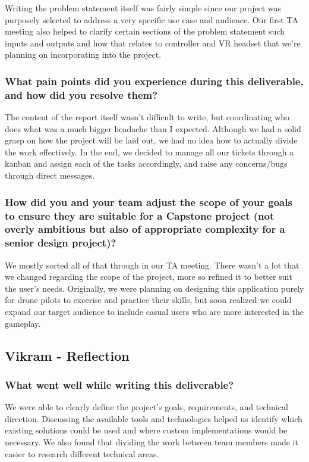 \documentclass{article}
\begin{document}
Writing the problem statement itself was fairly simple since our
project was purposely selected to address a very specific use case
and audience. Our first TA meeting also helped to clarify certain sections of
the problem statement such inputs and outputs and how that relates to controller
and VR headset that we're planning on incorporating into the project.

\subsubsection*{What pain points did you experience during this deliverable, and how did you resolve them?}

The content of the report itself wasn't difficult to write, but coordinating who does what was a
much bigger headache than I expected. Although we had a solid grasp on how the project
will be laid out, we had no idea how to actually divide the work effectively. In the end,
we decided to manage all our tickets through a kanban and assign each of the tasks accordingly,
and raise any concerns/bugs through direct messages.

\subsubsection*{How did you and your team adjust the scope of your goals to ensure
    they are suitable for a Capstone project (not overly ambitious but also of
    appropriate complexity for a senior design project)?}

We mostly sorted all of that through in our TA meeting. There wasn't a lot that
we changed regarding the scope of the project, more so refined it to better suit
the user's needs. Originally, we were planning on designing this application purely 
for drone pilots to excerise and practice their skills, but soon realized we could
expand our target audience to include casual users who are more interested in the
gameplay.

\subsection*{Vikram - Reflection}
\subsubsection*{What went well while writing this deliverable?}

We were able to clearly define the project's goals, requirements, and technical direction. Discussing the available tools and technologies helped us identify which existing solutions could be used and where custom implementations would be necessary. We also found that dividing the work between team members made it easier to research different technical areas.
\end{document}
